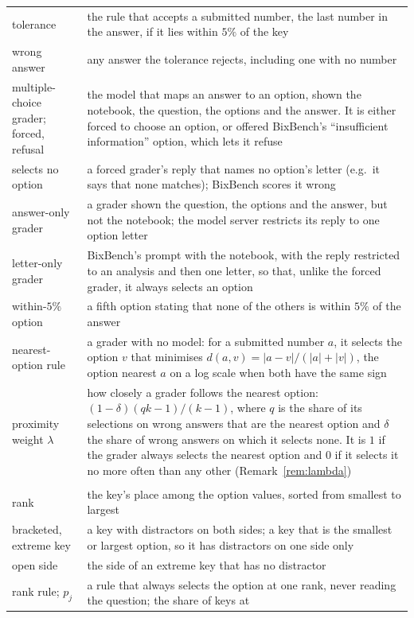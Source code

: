 \documentclass{article}
\begin{document}
\begin{table}[htbp]
\begin{tabularx}{\linewidth}{@{}lX@{}}
tolerance & the rule that accepts a submitted number, the last number in the answer, if it lies within $5\%$ of the
key\\
wrong answer & any answer the tolerance rejects, including one with no number\\
multiple-choice grader; forced, refusal & the model that maps an answer to an option, shown the notebook, the
question, the options and the answer. It is either forced to choose an option, or offered BixBench's ``insufficient
information'' option, which lets it refuse\\
selects no option & a forced grader's reply that names no option's letter (e.g.\ it says that none matches); BixBench
scores it wrong\\
answer-only grader & a grader shown the question, the options and the answer, but not the notebook; the model server
restricts its reply to one option letter\\
letter-only grader & BixBench's prompt with the notebook, with the reply restricted to an analysis and then one
letter, so that, unlike the forced grader, it always selects an option\\
within-$5\%$ option & a fifth option stating that none of the others is within $5\%$ of the answer\\
nearest-option rule & a grader with no model: for a submitted number $a$, it selects the option $v$ that minimises
$d(a,v)=|a-v|/(|a|+|v|)$, the option nearest $a$ on a log scale when both have the same sign\\
proximity weight $\lambda$ & how closely a grader follows the nearest option: $(1-\delta)(qk-1)/(k-1)$, where $q$ is
the share of its selections on wrong answers that are the nearest option and $\delta$ the share of wrong answers on
which it selects none. It is $1$ if the grader always selects the nearest option and $0$ if it selects it no more
often than any other (Remark~\ref{rem:lambda})\\
\addlinespace
\multicolumn{2}{@{}l}{\emph{The options}}\\
rank & the key's place among the option values, sorted from smallest to largest\\
bracketed, extreme key & a key with distractors on both sides; a key that is the smallest or largest option, so it
has distractors on one side only\\
open side & the side of an extreme key that has no distractor\\
rank rule; $p_j$ & a rule that always selects the option at one rank, never reading the question; the share of keys at

\end{tabularx}
\end{table}
\end{document}
